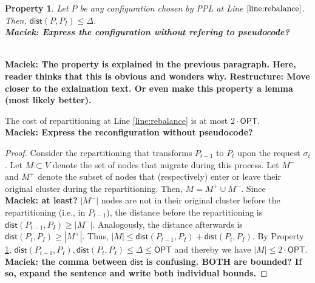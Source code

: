 \documentclass[manuscript,screen=true, review, anonymous]{acmart}
\newcommand{\OPT}{\textsf{OPT}\xspace}
\newcommand{\PPL}{\textsf{PPL}\xspace}
\newcommand{\dist}{\textsf{dist}}
\newtheorem{property}{Property}
\newcommand\maciek[1]{\color{brown}\textbf{\\ Maciek: #1}\color{black}}
\begin{document}
\begin{property} \label{prop:dist<OPT}
	Let $P$ be any configuration chosen by \PPL at Line $\ref{line:rebalance}$.
	Then, $\dist(P,P_I) \leq \Delta$.
	\maciek{Express the configuration without refering to pseudocode?}
\end{property}
\maciek{The property is explained in the previous paragraph. Here, reader thinks that this is obvious and wonders why. Restructure: Move closer to the exlaination text. Or even make this property a lemma (most likely better).}

\begin{lemma}	\label{lemma:rebalancecost}
	The cost of repartitioning at Line \ref{line:rebalance} is at most $2\cdot\OPT$.
	\maciek{Express the reconfiguration without pseudocode?}
\end{lemma}
\begin{proof}
	Consider the repartitioning that transforms $P_{t-1}$ to $P_t$ upon the request $\sigma_t$.
	Let $M \subset V$ denote the set of nodes that migrate during this process.
	Let $M^-$ and $M^+$ denote the subset of nodes that (respectively)
	enter or leave their original cluster during the repartitioning.    
	Then,
	$M = M^+ \cup M^-$.
	Since \maciek{at least?} $|M^-|$ nodes are not in their original cluster before the repartitioning (i.e., in $P_{t-1}$),
	the distance before the repartitioning is $\dist(P_{t-1},P_I) \geq | M^-|$.
	Analogously,
	the distance afterwards is $\dist(P_{t},P_I) \geq | M^+|$.
	Thus,
	$|M| \leq \dist(P_{t-1},P_I) + \dist(P_{t},P_I)$.
	By Property \ref{prop:dist<OPT},
	$\dist(P_{t-1},P_I) , \dist(P_{t},P_I) \leq \Delta \leq \OPT$
	and thereby we have	
	$|M| \leq 2\cdot\OPT$.
	\maciek{the comma between $\dist$ is confusing. BOTH are bounded? If so, expand the sentence and write both individual bounds.}
\end{proof}
\end{document}
